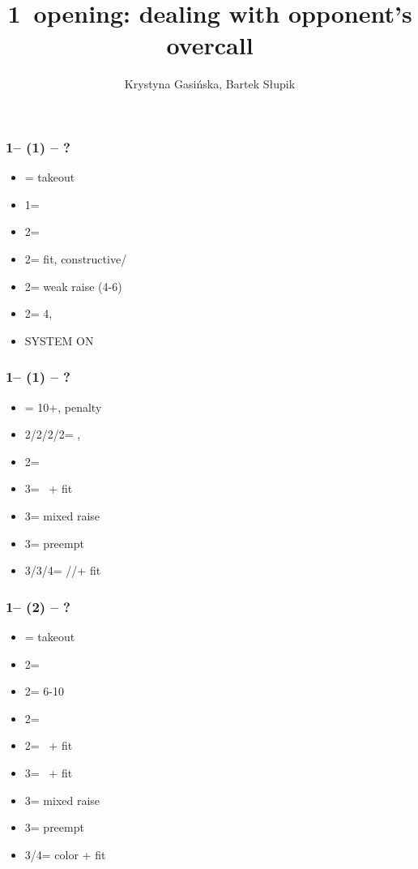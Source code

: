 \documentclass[12pt, a4paper]{article}
\title{1\hearts\ opening: dealing with opponent's overcall}
\author{Krystyna Gasińska, Bartek Słupik}
\begin{document}
\maketitle


\subsubsection*{1\hearts -- (1\spades) -- ?}
\begin{itemize}
    \item \dbl = takeout
    \item 1\nt = \clubs
    \item 2\clubs = \diams
    \item 2\diams = fit, constructive/\gf
    \item 2\hearts = weak raise (4-6)
    \item 2\spades = 4\hearts, \inv
    \item \small{SYSTEM ON}
\end{itemize}

\subsubsection*{1\hearts -- (1\nt) -- ?}
\begin{itemize}
    \item \dbl = 10+, penalty
    \item 2\clubs/2\diams/2\hearts/2\spades = \nat, \nf
    \item 2\nt = \minor
    \item 3\clubs = \inv\ + fit
    \item 3\diams = mixed raise
    \item 3\hearts = preempt
    \item 3\spades/3\nt/4\clubs = \spades/\diams/\clubs + fit
\end{itemize}

\subsubsection*{1\hearts -- (2\clubs) -- ?}
\begin{itemize}
    \item \dbl = takeout
    \item 2\diams = \fonce
    \item 2\hearts = 6-10
    \item 2\spades = \fonce
    \item 2\nt = \gf\ + fit
    \item 3\clubs = \inv\ + fit
    \item 3\diams = mixed raise
    \item 3\hearts = preempt
    \item 3\spades/4\diams = color + fit
\end{itemize}
\end{document}
